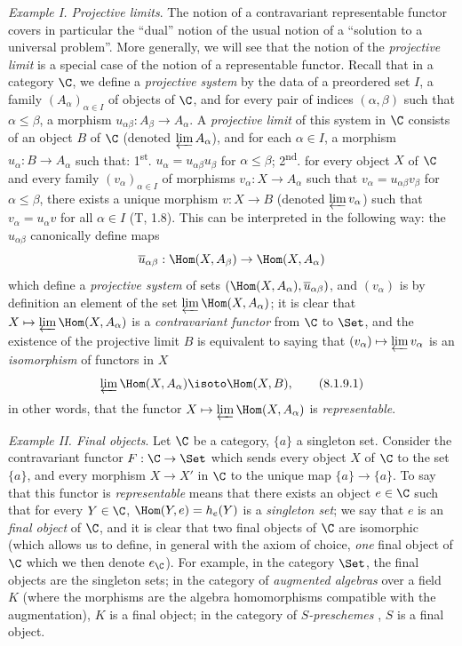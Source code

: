 \begin{env}[8.1.9]
\label{0.8.1.9}
\textit{Example I. Projective limits}.
The notion of a contravariant representable functor covers in particular the ``dual'' notion of the usual notion of a ``solution to a universal problem''.
More generally, we will see that the notion of the \emph{projective limit} is a special case of the notion of a representable functor.
Recall that in a category $\C$, we define a \emph{projective system} by the data of a preordered set $I$, a family $(A_\alpha)_{\alpha\in I}$ of objects of $\C$, and for every pair of indices $(\alpha,\beta)$ such that $\alpha\leq\beta$, a morphism $u_{\alpha\beta}:A_\beta\to A_\alpha$.
A \emph{projective limit} of this system in $\C$ consists of an object $B$ of $\C$ (denoted $\varprojlim A_\alpha$), and for each $\alpha\in I$, a morphism $u_\alpha:B\to A_\alpha$ such that: 1\textsuperscript{st}. $u_\alpha=u_{\alpha\beta}u_\beta$ for $\alpha\leq\beta$; 2\textsuperscript{nd}. for every object $X$ of $\C$ and every family $(v_\alpha)_{\alpha\in I}$ of morphisms $v_\alpha:X\to A_\alpha$ such that $v_\alpha=u_{\alpha\beta}v_\beta$ for $\alpha\leq\beta$, there exists a unique morphism $v:X\to B$ (denoted $\varprojlim v_\alpha$) such that $v_\alpha=u_\alpha v$ for all $\alpha\in I$ (T, 1.8).
This can be interpreted in the following way: the $u_{\alpha\beta}$ canonically define maps
\[
  \overline{u}_{\alpha\beta}:\Hom(X,A_\beta)\to\Hom(X,A_\alpha)
\]
which define a \emph{projective system} of sets $(\Hom(X,A_\alpha),\overline{u}_{\alpha\beta})$, and $(v_\alpha)$ is by definition an element of the set $\varprojlim\Hom(X,A_\alpha)$; it is clear that $X\mapsto\varprojlim\Hom(X,A_\alpha)$ is a \emph{contravariant functor} from $\C$ to $\Set$, and the existence of the projective limit $B$ is equivalent to saying that $(v_\alpha)\mapsto\varprojlim v_\alpha$ is an \emph{isomorphism} of functors in $X$
\[
  \varprojlim\Hom(X,A_\alpha)\isoto\Hom(X,B),
  \tag{8.1.9.1}
\]
in other words, that the functor $X\mapsto\varprojlim\Hom(X,A_\alpha)$ is \emph{representable}.
\end{env}

\begin{env}[8.1.10]
\label{0.8.1.10}
\textit{Example II. Final objects}.
Let $\C$ be a category, $\{a\}$ a singleton set.
Consider the contravariant functor $F:\C\to\Set$ which sends every object $X$ of $\C$ to the set $\{a\}$, and every morphism $X\to X'$ in $\C$ to the unique map $\{a\}\to\{a\}$.
To say that this functor is \emph{representable} means that there exists an object $e\in\C$ such that for every $Y\in\C$, $\Hom(Y,e)=h_e(Y)$ is a \emph{singleton set}; we say that $e$ is an \emph{final object} of $\C$, and it is clear that two final objects of $\C$ are isomorphic (which allows us to define, in general with the axiom of choice, \emph{one} final object of $\C$ which we then denote $e_\C$).
For example, in the category $\Set$, the final objects are the singleton sets; in the category of \emph{augmented algebras} over a field $K$ (where the morphisms are the algebra homomorphisms compatible with the augmentation), $K$ is a final object; in the category of \emph{$S$-preschemes} , $S$ is a final object.
\end{env}

